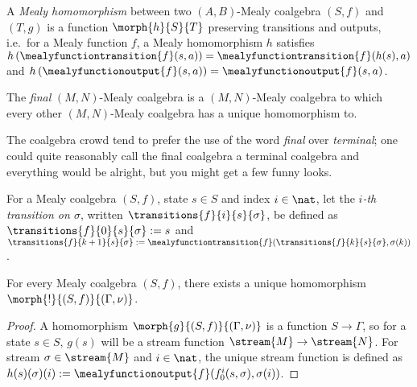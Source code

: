 \begin{definition}
    A \emph{Mealy homomorphism} between two \((A,B)\)-Mealy coalgebra \((S,f)\)
    and \((T,g)\) is a function \(\morph{h}{S}{T}\) preserving transitions and
    outputs, i.e.\ for a Mealy function \(f\), a Mealy homomorphism \(h\)
    satisfies \(
        h\left(\mealyfunctiontransition{f}(s, a)\right)
        =
        \mealyfunctiontransition{f}(h(s), a)
    \) and \(
        h\left(\mealyfunctionoutput{f}(s, a)\right)
        =
        \mealyfunctionoutput{f}(s, a)
    \).
\end{definition}

The \emph{final} \((M,N)\)-Mealy coalgebra is a \((M,N)\)-Mealy coalgebra to
which every other \((M,N)\)-Mealy coalgebra has a unique homomorphism to.

\begin{remark}
    The coalgebra crowd tend to prefer the use of the word \emph{final} over
    \emph{terminal}; one could quite reasonably call the final coalgebra a
    terminal coalgebra and everything would be alright, but you might get a few
    funny looks.
\end{remark}

\begin{notation}\label{not:transitions}
    For a Mealy coalgebra \(
        (S, f)
    \), state \(s \in S\) and index \(i \in \nat\), let the
    \emph{\(i\)-th transition on \(\sigma\)}, written
    \(\transitions{f}{i}{s}{\sigma}\), be defined as
    \(\transitions{f}{0}{s}{\sigma} := s\) and
    \(\transitions{f}{k+1}{s}{\sigma} :=
        \mealyfunctiontransition{f}(\transitions{f}{k}{s}{\sigma}, \sigma(k))
    \).
\end{notation}

\begin{proposition}
    \label{prop:final-coalgebra}
    For every Mealy coalgebra \((S,f)\), there exists a
    unique homomorphism \(\morph{{!}}{(S,f)}{(\Gamma,\nu)}\).
\end{proposition}
\begin{proof}
    A homomorphism \(\morph{g}{(S, f)}{(\Gamma, \nu)}\) is a function
    \(S \to \Gamma\), so for a state \(s \in S\), \(g(s)\) will be a stream
    function \(\stream{M} \to \stream{N}\).
    For stream \(\sigma \in \stream{M}\) and \(i \in \nat\), the unique stream
    function is defined as
    \(
        h(s)(\sigma)(i)
        :=
        \mealyfunctionoutput{f}(f^i_0(s, \sigma), \sigma(i))
    \).
\end{proof}

